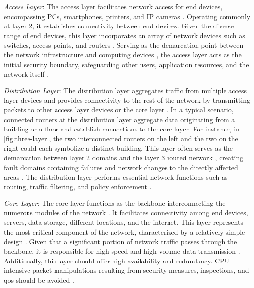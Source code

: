 \textit{Access Layer}:
The access layer facilitates network access for end devices, encompassing PCs,
    smartphones, printers, and IP cameras \cite{cisco_net_size}.
Operating commonly at layer 2, it establishes connectivity between end devices.
Given the diverse range of end devices, this layer incorporates an array of
    network devices such as switches, access points, and routers
    \cite{cisco_campus_net}.
Serving as the demarcation point between the network infrastructure and
    computing devices \cite{cisco_campus_net}, the access layer acts as the
    initial security boundary, safeguarding other users, application resources,
    and the network itself \cite{cisco_design_guide}.

\textit{Distribution Layer}:
The distribution layer aggregates traffic from multiple access layer devices
    and provides connectivity to the rest of the network by transmitting
    packets to other access layer devices or the core layer
    \cite{cisco_campus_net}.
In a typical scenario, connected routers at the distribution layer aggregate
    data originating from a building or a floor and establish connections to
    the core layer.
For instance, in \autoref{fig:three-layer}, the two interconnected routers on
    the left and the two on the right could each symbolize a distinct building.
This layer often serves as the demarcation between layer 2 domains and the
    layer 3 routed network \cite{cisco_net_size}, creating fault domains
    containing failures and network changes to the directly affected areas
    \cite{cisco_design_guide}.
The distribution layer performs essential network functions such as routing,
    traffic filtering, and policy enforcement \cite{cisco_campus_net}.


\textit{Core Layer}:
The core layer functions as the backbone interconnecting the numerous modules
    of the network \cite{cisco_campus_net}.
It facilitates connectivity among end devices, servers, data storage, different
    locations, and the internet.
This layer represents the most critical component of the network, characterized
    by a relatively simple design \cite{cisco_design_guide}.
Given that a significant portion of network traffic passes through the
    backbone, it is responsible for high-speed and high-volume data
    transmission \cite{cisco_campus_net}.
Additionally, this layer should offer high availability and redundancy.
CPU-intensive packet manipulations resulting from security measures,
    inspections, and \gls{qos} should be avoided \cite{cisco_campus_net}.



